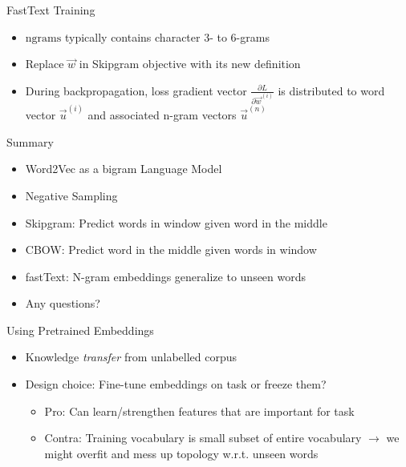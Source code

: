 \documentclass[11pt,compress,t,notes=noshow, xcolor=table]{beamer}
\begin{document}

\begin{vbframe}{FastText Training}

\vfill

\begin{itemize}
\item $\mathrm{ngrams}$ typically contains character 3- to 6-grams
\item Replace $\vec w$ in Skipgram objective with its new definition
\item During backpropagation, loss gradient vector $\frac{\partial L}{\partial \vec w^{(i)}}$ is distributed to word vector $\vec u^{(i)}$ and associated n-gram vectors $\vec u^{(n)}$
\end{itemize}

\vfill

\end{vbframe}


\begin{vbframe}{Summary}

\vfill

\begin{itemize}
	\item Word2Vec as a bigram Language Model
	\item Negative Sampling
	\item Skipgram: Predict words in window given word in the middle
	\item CBOW: Predict word in the middle given words in window
	\item fastText: N-gram embeddings generalize to unseen words
	\item Any questions?
\end{itemize}

\vfill

\end{vbframe}


\begin{vbframe}{Using Pretrained Embeddings}

\vfill

\begin{itemize}
	\item Knowledge \emph{transfer} from unlabelled corpus
	\item Design choice: Fine-tune embeddings on task or freeze them?
		\begin{itemize}
			\item Pro: Can learn/strengthen features that are important for task
			\item Contra: Training vocabulary is small subset of entire vocabulary $\rightarrow$ we might overfit and mess up topology w.r.t. unseen words
		\end{itemize}
\end{itemize}

\vfill

\end{vbframe}
\end{document}
